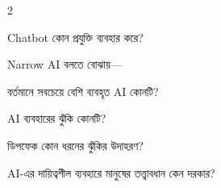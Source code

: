 \begin{topicbody}
\begin{multicols}{2}
\begin{compactenum}
\item \begin{minipage}[t]{\linewidth}Chatbot কোন প্রযুক্তি ব্যবহার করে?\par {}\par\end{minipage}

\item \begin{minipage}[t]{\linewidth}Narrow AI বলতে বোঝায়—\par {}\par\end{minipage}

\item \begin{minipage}[t]{\linewidth}বর্তমানে সবচেয়ে বেশি ব্যবহৃত AI কোনটি?\par {}\par\end{minipage}

\item \begin{minipage}[t]{\linewidth}AI ব্যবহারের ঝুঁকি কোনটি?\par {}\par\end{minipage}

\item \begin{minipage}[t]{\linewidth}ডিপফেক কোন ধরনের ঝুঁকির উদাহরণ?\par {}\par\end{minipage}

\item \begin{minipage}[t]{\linewidth}AI-এর দায়িত্বশীল ব্যবহারে মানুষের তত্ত্বাবধান কেন দরকার?\par {}\par\end{minipage}


\end{compactenum}
\end{multicols}
\end{topicbody}
